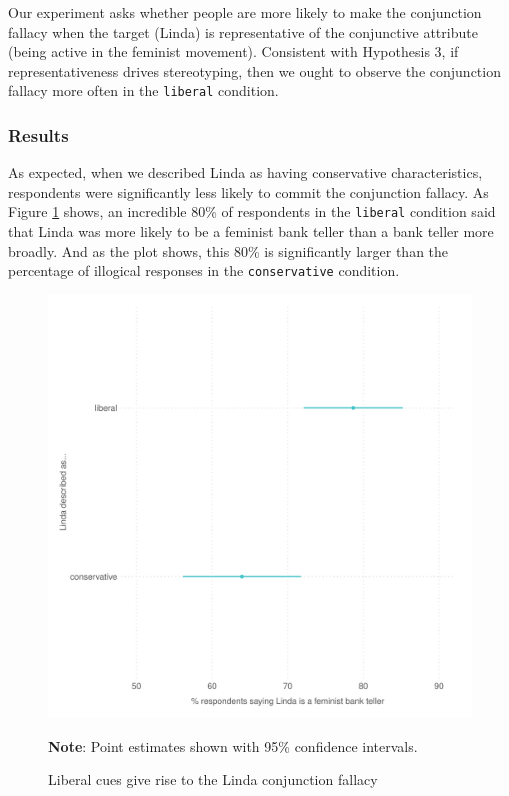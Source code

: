 \documentclass[12pt, letterpaper]{article}
\begin{document}
Our experiment asks whether people are more likely to make the conjunction fallacy when the target (Linda) is representative of the conjunctive attribute (being active in the feminist movement). Consistent with Hypothesis 3, if representativeness drives stereotyping, then we ought to observe the conjunction fallacy more often in the {\tt liberal} condition.

\subsubsection{Results}

As expected, when we described Linda as having conservative characteristics, respondents were significantly less likely to commit the conjunction fallacy. As Figure \ref{fig:linda} shows, an incredible 80\% of respondents in the {\tt liberal} condition said that Linda was more likely to be a feminist bank teller than a bank teller more broadly. And as the plot shows, this 80\% is significantly larger than the percentage of illogical responses in the {\tt conservative} condition.

\begin{figure}
\caption{Liberal cues give rise to the Linda conjunction fallacy}
\label{fig:linda}
\begin{center}
\includegraphics[width=1\textwidth]{../figs/linda_gg.pdf}
\end{center}
\scriptsize{\textbf{Note}: Point estimates shown with 95\% confidence intervals.}
\end{figure}
\end{document}
